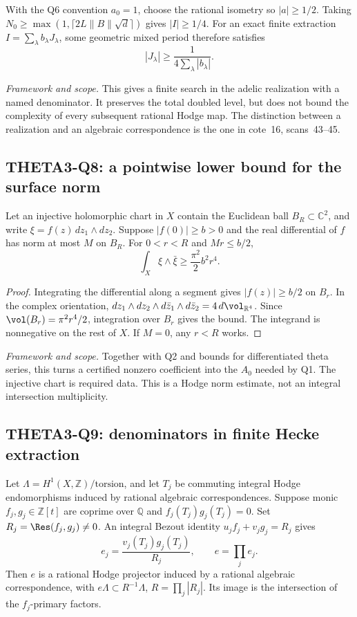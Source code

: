 \documentclass[11pt]{article}
\newcommand{\Q}{\mathbb Q}\newcommand{\C}{\mathbb C}\newcommand{\Z}{\mathbb Z}\newcommand{\R}{\mathbb R}\newcommand{\A}{\mathbb A}\newcommand{\OO}{\mathcal O}
\newcommand{\framework}[1]{\par\smallskip\noindent\textit{Framework and scope.} #1\par}
\theoremstyle{definition}\newtheorem{definition}[theorem]{Definition}\newtheorem{remark}[theorem]{Remark}
\begin{document}
With the Q6 convention $a_0=1$, choose the rational isometry so $|a|\geq1/2$. Taking
$N_0\geq\max(1,\lceil2L\|B\|\sqrt d\rceil)$ gives $|I|\geq1/4$. For an exact finite extraction $I=\sum_\lambda b_\lambda J_\lambda$, some geometric mixed period therefore satisfies
\begin{equation}\label{eq:quarter}
 |J_\lambda|\geq\frac1{4\sum_\lambda|b_\lambda|}.
\end{equation}
\framework{This gives a finite search in the adelic realization with a named denominator. It preserves the total doubled level, but does not bound the complexity of every subsequent rational Hodge map. The distinction between a realization and an algebraic correspondence is the one in cote~16, scans~43--45.}

\subsection{THETA3-Q8: a pointwise lower bound for the surface norm}\label{Q8}
Let an injective holomorphic chart in $X$ contain the Euclidean ball $B_R\subset\C^2$, and write
$\xi=f(z)\,dz_1\wedge dz_2$. Suppose $|f(0)|\geq b>0$ and the real differential of $f$ has norm at most $M$ on $B_R$. For $0<r<R$ and $Mr\leq b/2$,
\begin{equation}\label{eq:local-norm}
 \int_X\xi\wedge\bar\xi\geq\frac{\pi^2}{2}b^2r^4.
\end{equation}
\begin{proof}
Integrating the differential along a segment gives $|f(z)|\geq b/2$ on $B_r$. In the complex orientation,
$dz_1\wedge dz_2\wedge d\bar z_1\wedge d\bar z_2=4\,d\vol_{\R^4}$.
Since $\vol(B_r)=\pi^2r^4/2$, integration over $B_r$ gives the bound. The integrand is nonnegative on the rest of $X$. If $M=0$, any $r<R$ works.
\end{proof}
\framework{Together with Q2 and bounds for differentiated theta series, this turns a certified nonzero coefficient into the $A_0$ needed by Q1. The injective chart is required data. This is a Hodge norm estimate, not an integral intersection multiplicity.}

\subsection{THETA3-Q9: denominators in finite Hecke extraction}\label{Q9}
Let $\Lambda=H^1(X,\Z)/\mathrm{torsion}$, and let $T_j$ be commuting integral Hodge endomorphisms induced by rational algebraic correspondences. Suppose monic $f_j,g_j\in\Z[t]$ are coprime over $\Q$ and
$f_j(T_j)g_j(T_j)=0$. Set $R_j=\Res(f_j,g_j)\ne0$. An integral Bezout identity
$u_jf_j+v_jg_j=R_j$ gives
\[
 e_j=\frac{v_j(T_j)g_j(T_j)}{R_j},\qquad e=\prod_j e_j.
\]
Then $e$ is a rational Hodge projector induced by a rational algebraic correspondence, with
$e\Lambda\subset R^{-1}\Lambda$, $R=\prod_j|R_j|$. Its image is the intersection of the $f_j$-primary factors.
\end{document}
